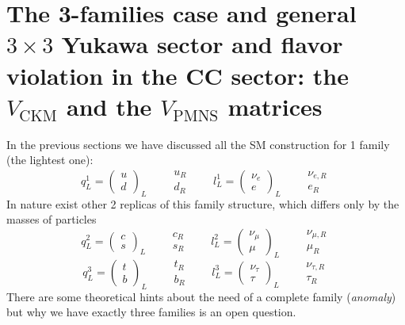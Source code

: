 \documentclass[TheoreticalPhy_ModB.tex]{subfiles}
\begin{document}
\section{The 3-families case and general $3\times3$ Yukawa sector and flavor violation in the CC sector: the $V_{\text{CKM}}$ and the $V_{\text{PMNS}}$ matrices}

In the previous sections we have discussed all the SM construction for 1 family (the lightest one):
\[q_L^1=\begin{pmatrix}u\\d\end{pmatrix}_L\qquad\begin{matrix}u_R\\d_R\end{matrix}\qquad l_L^1=\begin{pmatrix}\nu_e\\e\end{pmatrix}_L\qquad\begin{matrix}\nu_{e, R}\\e_R\end{matrix}\]
In nature exist other 2 replicas of this family structure, which differs only by the masses of particles
\[q_L^2=\begin{pmatrix}c\\s\end{pmatrix}_L\qquad\begin{matrix}c_R\\s_R\end{matrix}\qquad l_L^2=\begin{pmatrix}\nu_\mu\\\mu\end{pmatrix}_L\qquad\begin{matrix}\nu_{\mu, R}\\\mu_R\end{matrix}\]
\[q_L^3=\begin{pmatrix}t\\b\end{pmatrix}_L\qquad\begin{matrix}t_R\\b_R\end{matrix}\qquad l_L^3=\begin{pmatrix}\nu_\tau\\\tau\end{pmatrix}_L\qquad\begin{matrix}\nu_{\tau, R}\\\tau_R\end{matrix}\]
There are some theoretical hints about the need of a complete family (\emph{anomaly}) but why we have exactly three families is an open question. 
\end{document}
